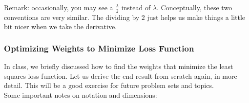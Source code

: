 \documentclass[11pt,letterpaper]{article}
\begin{document}
\noindent Remark: occasionally, you may see a $\frac{\lambda}{2}$ instead of $\lambda$. Conceptually, these two conventions are very similar. The dividing by $2$ just helps us make things a little bit nicer when we take the derivative.


\subsubsection{Optimizing Weights to Minimize Loss Function}

In class, we briefly discussed how to find the weights that minimize the least squares loss function. Let us derive the end result from scratch again, in more detail. This will be a good exercise for future problem sets and topics.\\

\noindent Some important notes on notation and dimensions:
\end{document}
